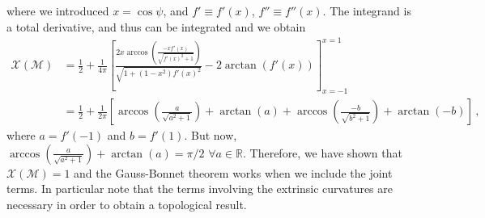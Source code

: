 \documentclass[11pt,letterpaper]{article}
\begin{document}
where we introduced $x=\cos\psi$, and $f'\equiv f'(x)$, $f''\equiv f''(x)$. The integrand is a total derivative, and thus can be integrated and we obtain
\begin{equation}
\begin{aligned}
\mathcal{X}(\mathcal{M})&=\frac{1}{2}+\frac{1}{4\pi}\left[\frac{2 x \arccos \left(\frac{-x f'(x)}{\sqrt{f'(x)^2+1}}\right)}{\sqrt{1+\left(1-x^2\right) f'(x)^2}}-2 \arctan\left(f'(x)\right)\right]_{x=-1}^{x=1}\\
&=\frac{1}{2}+\frac{1}{2\pi}\left[\arccos\left(\frac{a}{\sqrt{a^2+1}}\right)+\arctan(a)+\arccos\left(\frac{-b}{\sqrt{b^2+1}}\right)+\arctan(-b)\right]\, ,
\end{aligned}
\end{equation}
where $a=f'(-1)$ and $b=f'(1)$. But now, $\arccos\left(\frac{a}{\sqrt{a^2+1}}\right)+\arctan(a)=\pi/2$  $\forall a\in\mathbb{R}$. Therefore, we have shown that $\mathcal{X}(\mathcal{M})=1$ and the Gauss-Bonnet theorem works when we include the joint terms. In particular note that the terms involving the extrinsic curvatures are necessary in order to obtain a topological result.


\renewcommand{\leftmark}{\MakeUppercase{Bibliography}}

%

\label{biblio}
\end{document}
